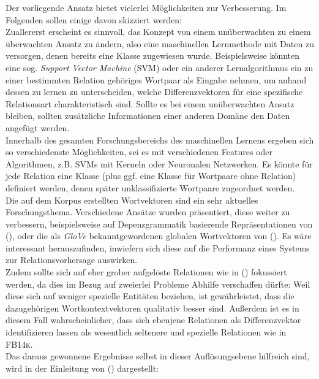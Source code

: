 Der vorliegende Ansatz bietet vielerlei Möglichkeiten zur Verbesserung. Im Folgenden sollen einige davon skizziert werden:\\
Zuallererst erscheint es sinnvoll, das Konzept von einem unüberwachten zu einem überwachten Ansatz zu ändern, also eine
maschinellen Lernmethode mit Daten zu versorgen, denen bereits eine Klasse zugewiesen wurde. Beispielsweise könnten eine
sog. \emph{Support Vector Machine} (SVM) oder ein anderer Lernalgorithmus ein zu einer bestimmten Relation gehöriges Wortpaar
als Eingabe nehmen, um anhand dessen zu lernen zu unterscheiden, welche Differenzvektoren für eine spezifische Relationsart
charakteristisch sind. Sollte es bei einem unüberwachten Ansatz bleiben, sollten zusätzliche Informationen einer anderen Domäne
den Daten angefügt werden.\\
Innerhalb des gesamten Forschungsbereichs des maschinellen Lernens ergeben sich so verschiedenste Möglichkeiten,
sei es mit verschiedenen Features oder Algorithmen, z.B. SVMs mit Kerneln oder Neuronalen Netzwerken. Es könnte für jede
Relation eine Klasse (plus ggf. eine Klasse für Wortpaare ohne Relation) definiert werden, denen später unklassifizierte
Wortpaare zugeordnet werden.\\

Die auf dem Korpus erstellten Wortvektoren sind ein sehr aktuelles Forschungsthema. Verschiedene Ansätze wurden
präsentiert, diese weiter zu verbessern, beispielsweise auf Depenzgrammatik basierende Repräsentationen von (\cite{levy2014dependency}),
oder die als \emph{GloVe} bekanntgewordenen globalen Wortvektoren von (\cite{pennington2014glove}).
Es wäre interessant herauszufinden, inwiefern sich diese auf die Performanz eines Systems zur Relationsvorhersage
auswirken.\\

Zudem sollte sich auf eher grober aufgelöste Relationen wie in (\cite{hendrickx2009semeval}) fokussiert werden, da dies im Bezug
auf zweierlei Probleme Abhilfe verschaffen dürfte: Weil diese sich auf weniger spezielle Entitäten beziehen, ist gewährleistet,
dass die dazugehörigen Wortkontextvektoren qualitativ besser sind. Außerdem ist es in diesem Fall wahrscheinlicher, dass
sich ebenjene Relationen als Differenzvektor identifizieren lassen als wesentlich seltenere und spezielle Relationen wie
in \textsc{FB14k}.\\
Das daraus gewonnene Ergebnisse selbst in dieser Auflösungsebene hilfreich sind, wird in der Einleitung von (\cite{hendrickx2009semeval})
dargestellt:

